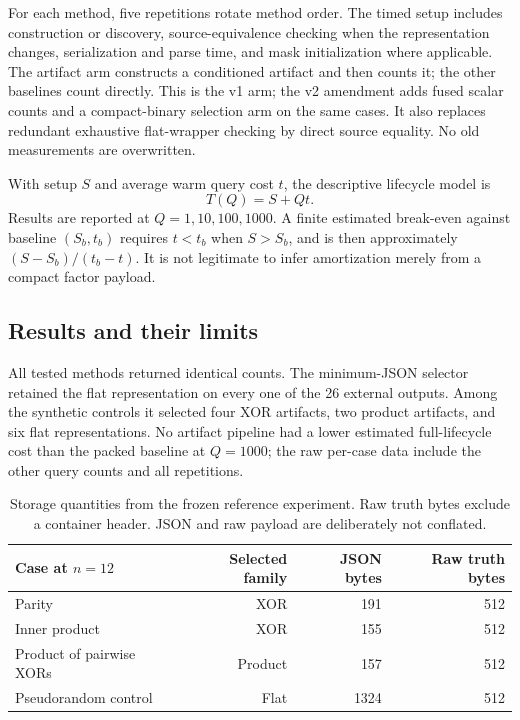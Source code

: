 \documentclass[11pt]{article}
\theoremstyle{definition}\newtheorem{definition}[theorem]{Definition}
\theoremstyle{remark}\newtheorem{remark}[theorem]{Remark}
\begin{document}
For each method, five repetitions rotate method order. The timed setup includes construction or discovery, source-equivalence checking when the representation changes, serialization and parse time, and mask initialization where applicable. The artifact arm constructs a conditioned artifact and then counts it; the other baselines count directly. This is the v1 arm; the v2 amendment adds fused scalar counts and a compact-binary selection arm on the same cases. It also replaces redundant exhaustive flat-wrapper checking by direct source equality. No old measurements are overwritten.

With setup $S$ and average warm query cost $t$, the descriptive lifecycle model is
\begin{equation}
 T(Q)=S+Qt.\label{eq:lifecycle}
\end{equation}
Results are reported at $Q=1,10,100,1000$. A finite estimated break-even against baseline $(S_b,t_b)$ requires $t<t_b$ when $S>S_b$, and is then approximately $(S-S_b)/(t_b-t)$. It is not legitimate to infer amortization merely from a compact factor payload.

\subsection{Results and their limits}
All tested methods returned identical counts. The minimum-JSON selector retained the flat representation on every one of the 26 external outputs. Among the synthetic controls it selected four XOR artifacts, two product artifacts, and six flat representations. No artifact pipeline had a lower estimated full-lifecycle cost than the packed baseline at $Q=1000$; the raw per-case data include the other query counts and all repetitions.

\begin{table}[ht]
\centering
\begin{tabular}{@{}lrrr@{}}\toprule
Case at $n=12$ & Selected family & JSON bytes & Raw truth bytes\\\midrule
Parity & XOR & 191 & 512\\
Inner product & XOR & 155 & 512\\
Product of pairwise XORs & Product & 157 & 512\\
Pseudorandom control & Flat & 1324 & 512\\\bottomrule
\end{tabular}
\caption{Storage quantities from the frozen reference experiment. Raw truth bytes exclude a container header. JSON and raw payload are deliberately not conflated.}\label{tab:storage}
\end{table}
\end{document}
